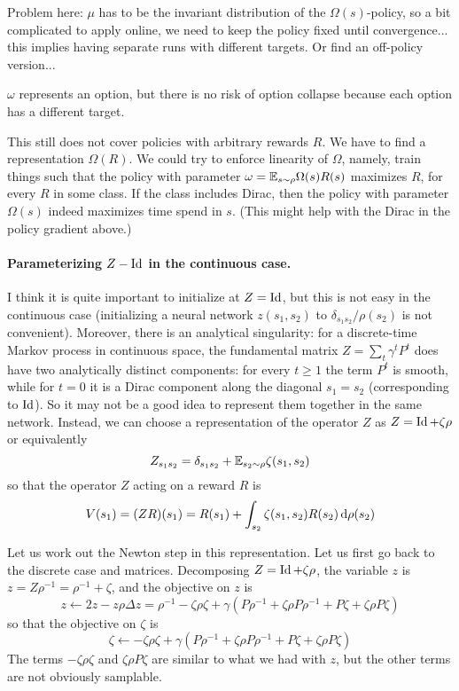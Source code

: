 \documentclass[11pt,a4paper]{article}
\begin{document}
Problem here: $\mu$ has to be the invariant distribution of the
$\Omega(s)$-policy, so a bit complicated to apply online, we need to keep
the policy fixed until convergence... this implies having separate runs
with different targets. Or find an off-policy version... 

$\omega$ represents an option, but there is no risk of option collapse
because each option has a different target.

This still does not cover policies with arbitrary rewards $R$. We have to
find a representation $\Omega(R)$. We could try to enforce linearity of
$\Omega$, namely, train things such that the policy with parameter
$\omega=\mathbb{E}_{s\sim \rho} \Omega(s)R(s)$ maximizes $R$, for every $R$ in some
class. If the class includes Dirac, then 
the policy with parameter
$\Omega(s)$ indeed maximizes time spend in $s$. (This might help with the
Dirac in the policy gradient above.)

\paragraph{Parameterizing $Z-\operatorname{Id}$ in the continuous case.} I think it is quite
important to initialize at $Z=\operatorname{Id}$, but this is not easy in the
continuous case (initializing a neural network $z(s_1,s_2)$ to
$\delta_{s_1s_2}/\rho(s_2)$ is not convenient). Moreover, there is an
analytical singularity: for a discrete-time Markov process in continuous
space, the fundamental matrix $Z=\sum_t \gamma^t P^t$ does have two
analytically distinct components: for every $t\geq 1$ the term $P^t$ is
smooth, while for $t=0$ it is a Dirac component along the diagonal
$s_1=s_2$ (corresponding to $\operatorname{Id}$). So it may not be a good idea to
represent them together in the same network. Instead, we can choose a
representation of the operator $Z$ as $Z=\operatorname{Id}+\zeta\rho$ or equivalently
\begin{equation}
Z_{s_1s_2}=\delta_{s_1s_2}+\mathbb{E}_{s_2\sim \rho} \zeta(s_1,s_2)
\end{equation}
so that the operator $Z$ acting on a reward $R$ is
\begin{equation}
V(s_1)=(ZR)(s_1)=R(s_1)+\int_{s_2} \zeta(s_1,s_2)R(s_2)\operatorname{d}\!{}\rho(s_2)
\end{equation}

Let us work out the Newton step in this representation. Let us first go
back to the discrete case and matrices. Decomposing $Z=\operatorname{Id}+\zeta\rho$,
the variable $z$ is $z=Z\rho^{-1}=\rho^{-1}+\zeta$, and the objective on
$z$ is 
\begin{equation}
z\gets 2z-z\rho\Delta z=\rho^{-1}-\zeta\rho\zeta+\gamma(
P\rho^{-1}+\zeta\rho P \rho^{-1}+P\zeta+\zeta\rho P \zeta)
\end{equation}
so that the objective on $\zeta$ is
\begin{equation}
\zeta\gets -\zeta\rho\zeta+\gamma(
P\rho^{-1}+\zeta\rho P \rho^{-1}+P\zeta+\zeta\rho P \zeta)
\end{equation}
The terms $-\zeta\rho \zeta$ and $\zeta\rho
P \zeta$ are similar to what we had with $z$, but the other terms are not
obviously samplable.
\end{document}
